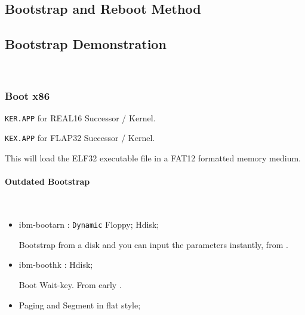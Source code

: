 \subsection{Bootstrap and Reboot Method}


\subsection{Bootstrap Demonstration} \

\subsubsection{Boot x86}

\verb`KER.APP` for REAL16 Successor / Kernel.

\verb`KEX.APP` for FLAP32 Successor / Kernel.

This will load the ELF32 executable file in a FAT12 formatted memory medium.

\paragraph{Outdated Bootstrap} \
\begin{itemize}
\item ibm-bootarn : \verb|Dynamic| Floppy; Hdisk;

	Bootstrap from a disk and you can input the parameters instantly, from .
\item ibm-boothk \B{Media}: Hdisk;

	Boot Wait-key. From early .
\end{itemize}



\begin{itemize}
	\item Paging and Segment in flat style;
\end{itemize}
